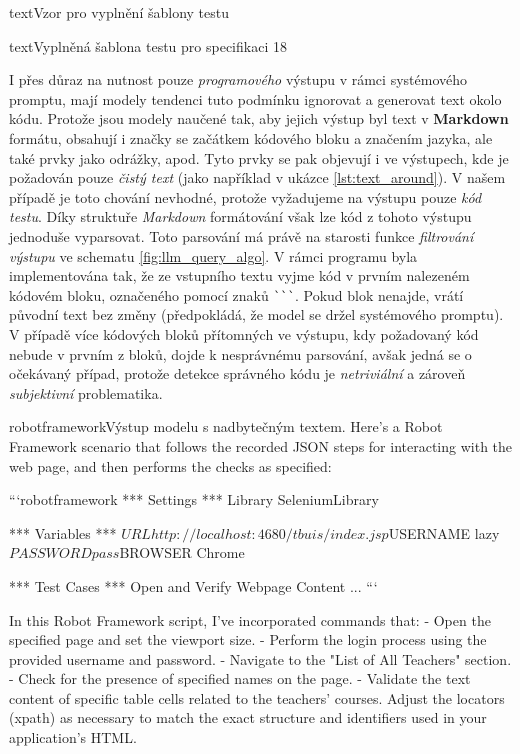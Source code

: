 \documentclass[czech, ma, kiv, he, iso690numb, pdf, viewonly]{fasthesis}
\begin{document}
\begin{code}{text}{Vzor pro vyplnění šablony testu \label{lst:template}}
{\begin{code}{text}{Vyplněná šablona testu pro specifikaci 18 \label{lst:spec18}}
{        I přes důraz na nutnost pouze \textit{programového} výstupu v rámci systémového promptu, mají modely tendenci tuto podmínku ignorovat a generovat text okolo kódu. Protože jsou modely naučené tak, aby jejich výstup byl text v \textbf{Markdown} formátu, obsahují i značky se začátkem kódového bloku a značením jazyka, ale také prvky jako odrážky, apod. Tyto prvky se pak objevují i ve výstupech, kde je požadován pouze \textit{čistý text} (jako například v ukázce \ref{lst:text_around}). V našem případě je toto chování nevhodné, protože vyžadujeme na výstupu pouze \textit{kód testu}. Díky struktuře \textit{Markdown} formátování však lze kód z tohoto výstupu jednoduše vyparsovat. Toto parsování má právě na starosti funkce \textit{filtrování výstupu} ve schematu \ref{fig:llm_query_algo}. V rámci programu byla implementována tak, že ze vstupního textu vyjme kód v prvním nalezeném kódovém bloku, označeného pomocí znaků \verb|```|. Pokud blok nenajde, vrátí původní text bez změny (předpokládá, že model se držel systémového promptu). V případě více kódových bloků přítomných ve výstupu, kdy požadovaný kód nebude v prvním z bloků, dojde k nesprávnému parsování, avšak jedná se o očekávaný případ, protože detekce správného kódu je \textit{netriviální} a zároveň \textit{subjektivní} problematika.

        \vfill
        \begin{code}{robotframework}{Výstup modelu s nadbytečným textem. \label{lst:text_around}}
Here's a Robot Framework scenario that follows the recorded JSON steps for interacting with the web page, and then performs the checks as specified:

```robotframework
*** Settings ***
Library           SeleniumLibrary

*** Variables ***
${URL}            http://localhost:4680/tbuis/index.jsp
${USERNAME}       lazy
${PASSWORD}       pass
${BROWSER}        Chrome

*** Test Cases ***
Open and Verify Webpage Content
...
```

In this Robot Framework script, I've incorporated commands that:
- Open the specified page and set the viewport size.
- Perform the login process using the provided username and password.
- Navigate to the "List of All Teachers" section.
- Check for the presence of specified names on the page.
- Validate the text content of specific table cells related to the teachers' courses.
Adjust the locators (xpath) as necessary to match the exact structure and identifiers used in your application's HTML. \end{code}

}
\end{code}}
\end{code}
\end{document}
